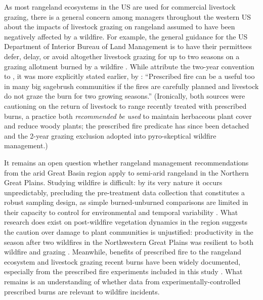 \documentclass[fire,article,submit,oneauthor,pdftex]{Definitions/mdpi}
\begin{document}
As most rangeland ecosystems in the US are used for commercial livestock grazing, there is a general concern among managers throughout the western US about the impacts of livestock grazing on rangeland assumed to have been negatively affected by a wildfire. 
For example, the general guidance for the US Department of Interior Bureau of Land Management is to have their permittees defer, delay, or avoid altogether livestock grazing for up to two seasons on a grazing allotment burned by a wildfire \cite{blm2007}. 
While \citet{kluth2024} attribute the two-year convention to \citet{blaisdell1982}, it was more explicitly stated earlier, by \citet[][p. 9]{wright1979}: ``Prescribed fire can be a useful too in many big sagebrush communities if the fires are carefully planned and livestock do not graze the burn for two growing seasons.''
(Ironically, both sources were cautioning on the return of livestock to range recently treated with prescribed burns, a practice both \emph{recommended be used} to maintain herbaceous plant cover and reduce woody plants; the prescribed fire predicate has since been detached and the 2-year grazing exclusion adopted into pyro-skeptical wildfire management.)

It remains an open question whether rangeland management recommendations from the arid Great Basin region apply to semi-arid rangeland in the Northern Great Plains. 
Studying wildfire is difficult: by its very nature it occurs unpredictably, precluding the pre-treatment data collection that constitutes a robust sampling design, as simple burned-unburned comparisons are limited in their capacity to control for environmental and temporal variability \cite{zaitsev2016}. 
What research does exist on post-wildfire vegetation dynamics in the region suggests the caution over damage to plant communities is unjustified: productivity in the season after two wildfires in the Northwestern Great Plains was resilient to both wildfire and grazing \cite{gates2017, kral-obrien2020, williams2022}. 
Meanwhile, benefits of prescribed fire to the rangeland ecosystem and livestock grazing recent burns have been widely documented, especially from the prescribed fire experiments included in this study \cite{powell2018, spiess2024, mcgranahan2022, wanchuk2024, wanchuk2024a}.
What remains is an understanding of whether data from experimentally-controlled prescribed burns are relevant to wildfire incidents. 
\end{document}
